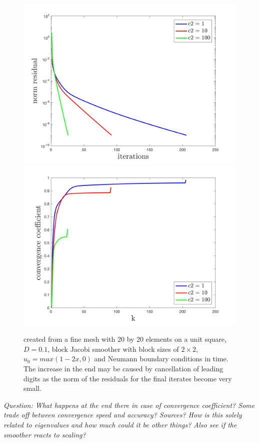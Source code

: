 \documentclass[../draft_1.tex]{subfiles}
\begin{document}
\begin{figure}[h!]
	\centering
	\includegraphics[scale=0.4]{images/implementation/c2_comparison/res_norm}
	\includegraphics[scale=0.4]{images/implementation/c2_comparison/conv_rate}
	\caption{created from a fine mesh with 20 by 20 elements on a unit square, $D = 0.1$, block Jacobi smoother with block sizes of $2 \times 2$, $u_0 = max(1-2x, 0)$ and Neumann boundary conditions in time. The increase in the end may be caused by cancellation of leading digits as the  norm of the residuals for the final iterates become very small.}
\end{figure}
\textit{Question: What happens at the end there in case of convergence coefficient? Some trade off between convergence speed and accuracy? Sources? How is this solely related to eigenvalues and how much could it be other things? Also see if the smoother reacts to scaling?}
\end{document}
